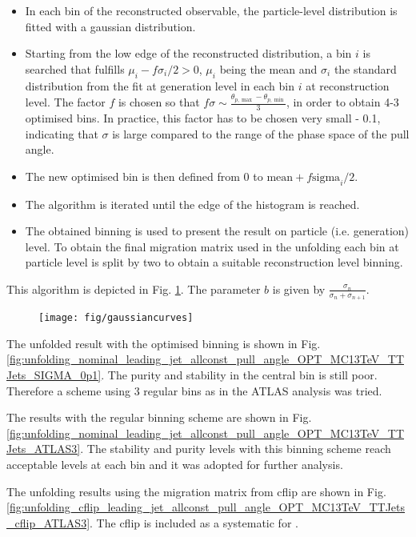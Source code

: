 \begin{itemize}
\item In each bin of the reconstructed observable, the particle-level distribution is fitted with a gaussian distribution.
\item Starting from the low edge of the reconstructed distribution, a bin $i$ is searched that fulfills $\mu_{i}-f\sigma_{i}/2 > 0$, $\mu_{i}$ being the mean and $\sigma_{i}$ the standard distribution from the fit at generation level in each bin $i$ at reconstruction level. The factor $f$ is chosen so that $f\sigma\sim\frac{\theta_{p,\max}-\theta_{p, \min}}{3}$, in order to obtain 4-3 optimised bins. In practice, this factor has to be chosen very small - 0.1, indicating that $\sigma$ is large compared to the range of the phase space of the pull angle.
\item The new optimised bin is then defined from 0 to $\text{mean}+f\text{sigma}_{i}/2$. 
\item The algorithm is iterated until the edge of the histogram is reached.
\item The obtained binning is used to present the result on particle (i.e. generation) level. To obtain the final migration matrix used in the unfolding each bin at particle level is split by two to obtain a suitable reconstruction level binning.
\end{itemize}

This algorithm is depicted in Fig. \ref{fig:gaussiancurves}. The parameter $b$ is given by $\frac{\sigma_{n}}{\sigma_{n} + \sigma_{n+1}}$.

\begin{figure}
  \centering
  \texttt{[image: fig/gaussiancurves]}
  \caption{}
  \label{fig:gaussiancurves}
\end{figure}

The unfolded result with the optimised binning is shown in Fig. \ref{fig:unfolding_nominal_leading_jet_allconst_pull_angle_OPT_MC13TeV_TTJets_SIGMA_0p1}. The purity and stability in the central bin is still poor. Therefore a scheme using 3 regular bins as in the ATLAS analysis \cite{ATLAS:2017iaz} was tried.

The results with the regular binning scheme are shown in Fig. \ref{fig:unfolding_nominal_leading_jet_allconst_pull_angle_OPT_MC13TeV_TTJets_ATLAS3}. The stability and purity levels with this binning scheme reach acceptable levels at each bin and it was adopted for further analysis.

The unfolding results using the migration matrix from \ttbar cflip are shown in Fig. \ref{fig:unfolding_cflip_leading_jet_allconst_pull_angle_OPT_MC13TeV_TTJets_cflip_ATLAS3}. The \ttbar cflip is included as a systematic for \ttbar.

